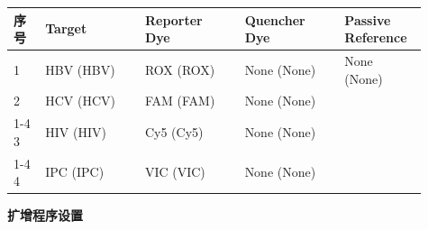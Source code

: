 \documentclass[UTF8,10pt,a4paper,fontset=fandol]{ctexart}
\newcommand{\fieldvalue}[1]{#1}
\newcommand{\handwritten}[1]{#1}
\begin{document}
\begin{tabular}{|p{0.07\linewidth}|p{0.22\linewidth}|p{0.22\linewidth}|p{0.22\linewidth}|p{0.18\linewidth}|}
\hline
序号 & Target & Reporter Dye & Quencher Dye & Passive Reference \\ \hline
1 &
\fieldvalue{\handwritten{HBV}} (HBV) &
\fieldvalue{\handwritten{ROX}} (ROX) &
\fieldvalue{\handwritten{None}} (None) &
\fieldvalue{\handwritten{None}} (None)
\\ \hline
2 &
\fieldvalue{\handwritten{HCV}} (HCV) &
\fieldvalue{\handwritten{FAM}} (FAM) &
\fieldvalue{\handwritten{None}} (None) &
\\ \cline{1-4}
3 &
\fieldvalue{\handwritten{HIV}} (HIV) &
\fieldvalue{\handwritten{Cy5}} (Cy5) &
\fieldvalue{\handwritten{None}} (None) &
\\ \cline{1-4}
4 &
\fieldvalue{\handwritten{IPC}} (IPC) &
\fieldvalue{\handwritten{VIC}} (VIC) &
\fieldvalue{\handwritten{None}} (None) &
\\ \hline
\end{tabular}

\medskip
\textbf{扩增程序设置}
\end{document}
